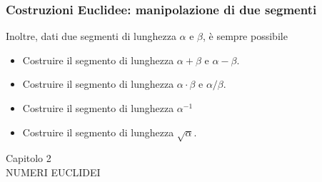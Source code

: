 \documentclass[11pt]{beamer}
\begin{document}
\begin{frame}
\frametitle{Costruzioni Euclidee: manipolazione di due segmenti}

Inoltre, dati due segmenti di lunghezza $\alpha$ e $\beta$, è sempre possibile

\begin{itemize}

\item Costruire il segmento di lunghezza $\alpha + \beta$ e $\alpha - \beta$.

\item Costruire il segmento di lunghezza $\alpha \cdot \beta$ e $\alpha / \beta$.

\item Costruire il segmento di lunghezza $\alpha^{-1} $

\item Costruire il segmento di lunghezza $\sqrt{\alpha}$.

\end{itemize}

\end{frame}



\begin{frame}
\begin{center}
Capitolo 2 \\
NUMERI EUCLIDEI
\end{center}
\end{frame}
\end{document}
